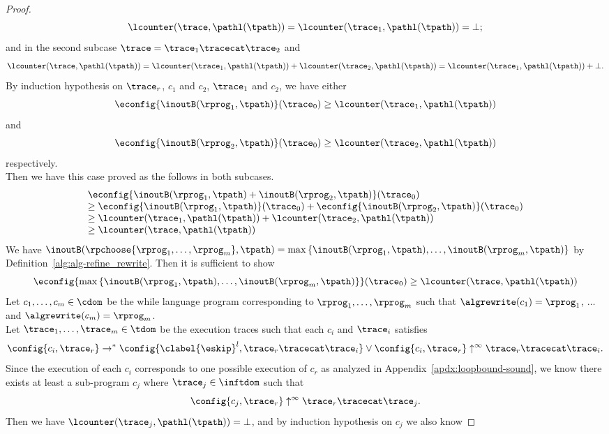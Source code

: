\begin{proof}
\[
  \lcounter(\trace, \pathl(\tpath))  = \lcounter(\trace_1,  \pathl(\tpath))  = \bot;
\]
and in the second subcase $\trace = \trace_1 \tracecat \trace_2$ and
\[
  \lcounter(\trace, \pathl(\tpath))  = \lcounter(\trace_1,  \pathl(\tpath))  + \lcounter(\trace_2,  \pathl(\tpath)) = \lcounter(\trace_1,  \pathl(\tpath)) + \bot.
\]
By induction hypothesis on $\trace_r$, $c_1$ and $c_2$, $\trace_1$ and $c_2$, we have
either 
\[
  \econfig{\inoutB(\rprog_1, \tpath)}(\trace_0)  \geq \lcounter(\trace_1,  \pathl(\tpath)) 
\]
and
\[
  \econfig{\inoutB(\rprog_2, \tpath)}(\trace_0) \geq \lcounter(\trace_2,  \pathl(\tpath))  
\]
respectively.
\\
Then we have this case proved as the follows in both subcases.
\[
  \begin{array}{l}
  \econfig{\inoutB(\rprog_1, \tpath) + \inoutB(\rprog_2, \tpath)}(\trace_0)
  \\
  \geq \econfig{\inoutB(\rprog_1, \tpath)}(\trace_0) + \econfig{\inoutB(\rprog_2, \tpath)}(\trace_0)
  \\
  \geq \lcounter(\trace_1,  \pathl(\tpath))  + \lcounter(\trace_2,  \pathl(\tpath)) 
  \\
  \geq \lcounter(\trace, \pathl(\tpath))
  \end{array}
  \] 
We have $\inoutB(\rpchoose{\rprog_1, \ldots, \rprog_m }, \tpath) = \max\left\{ \inoutB(\rprog_1, \tpath), \ldots, \inoutB(\rprog_m, \tpath) \right\}$ by Definition~\ref{alg:alg-refine_rewrite}.
Then it is sufficient to show
\[
  \econfig{\max\left\{ \inoutB(\rprog_1, \tpath), \ldots, \inoutB(\rprog_m, \tpath) \right\}}(\trace_0) \geq \lcounter(\trace, \pathl(\tpath)) 
\]
Let $c_1, \ldots, c_m \in \cdom$ be the while language program corresponding to $\rprog_1, \ldots, \rprog_m$ such that $\algrewrite(c_1) = \rprog_1$, $\ldots$ and  $\algrewrite(c_m) = \rprog_m$.
\\
Let $\trace_1, \ldots, \trace_m \in \tdom$ be the execution traces such that each $c_i$ and $\trace_i$ satisfies 
\[
  \config{c_i, \trace_r} \to^* 
  \config{\clabel{\eskip}^{l}, \trace_r \tracecat \trace_i}
  \lor 
  \config{c_i, \trace_r} \uparrow^{\infty}  \trace_r \tracecat \trace_i.
\]
Since the execution of each $c_i$ corresponds to one possible execution of $c_r$ as analyzed in Appendix~\ref{apdx:loopbound-sound}, we know there exists at least a sub-program $c_j$ where $\trace_j \in \inftdom$ such that
\[
  \config{c_j, \trace_r} \uparrow^{\infty} \trace_r \tracecat \trace_j.
\]
Then we have $\lcounter(\trace_j, \pathl(\tpath))  = \bot$, and by induction hypothesis on $c_j$ we also know 

\end{proof}
